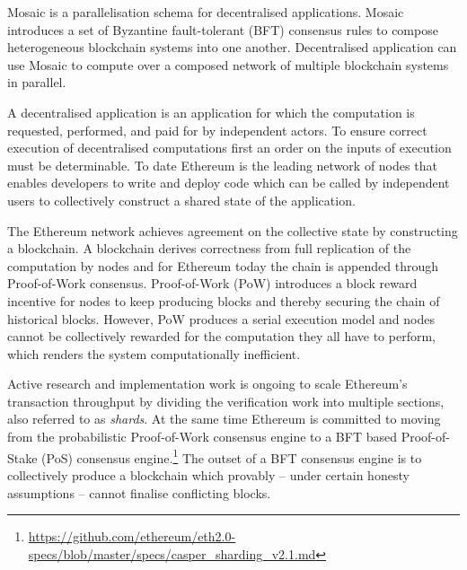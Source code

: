 \documentclass[12pt,a4paper]{article}
\begin{document}
Mosaic is a parallelisation schema for decentralised applications.
Mosaic introduces a set of Byzantine fault-tolerant (BFT) consensus rules to compose heterogeneous blockchain systems into one another.
Decentralised application can use Mosaic to compute over a composed network of multiple blockchain systems in parallel.

A decentralised application is an application for which the computation is requested, performed, and paid for by independent actors.
To ensure correct execution of decentralised computations first an order on the inputs of execution must be determinable.
To date Ethereum is the leading network
of nodes that enables developers to write and deploy code which can be called by independent users to collectively construct a shared state of the application.

The Ethereum network achieves agreement on the collective state by constructing a blockchain.
A blockchain derives correctness from full replication of the computation by nodes and for Ethereum today the chain is appended through Proof-of-Work consensus.
Proof-of-Work (PoW) introduces a block reward incentive for nodes to keep producing blocks and thereby securing the chain of historical blocks.
However, PoW produces a serial execution model and nodes cannot be collectively rewarded for the computation they all have to perform, which renders the system computationally inefficient\cite{verifiersdilemma}.

Active research and implementation work is ongoing to scale Ethereum's transaction throughput by dividing the verification work into multiple sections, also referred to as \emph{shards}.
At the same time Ethereum is committed to moving from the probabilistic Proof-of-Work consensus engine to a BFT based Proof-of-Stake (PoS) consensus engine.\footnote{
	\url{https://github.com/ethereum/eth2.0-specs/blob/master/specs/casper_sharding_v2.1.md}
}
The outset of a BFT consensus engine is to collectively produce a blockchain which provably -- under certain honesty assumptions -- cannot finalise conflicting blocks.

\end{document}
